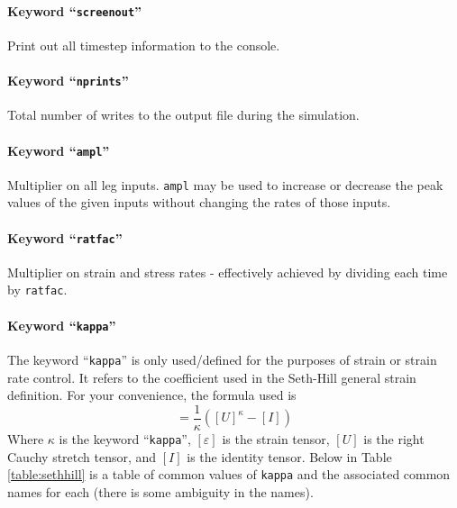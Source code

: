 \documentclass[11pt]{article}
\newcommand{\ratfac}{\texttt{ratfac}}
\newcommand{\shparam}{\texttt{kappa}}
\newcommand{\ampl}{\texttt{ampl}}
\newcommand{\nprints}{\texttt{nprints}}
\newcommand{\screenout}{\texttt{screenout}}
\begin{document}
\paragraph{Keyword ``\screenout{}''}
Print out all timestep information to the console.

\paragraph{Keyword ``\nprints{}''}
Total number of writes to the output file during the simulation.

\paragraph{Keyword ``\ampl{}''}
Multiplier on all leg inputs.  \ampl{} may be used to increase or decrease the peak
values of the given inputs without changing the rates of those inputs.

\paragraph{Keyword ``\ratfac{}''}
Multiplier on strain and stress rates - effectively achieved by dividing each
time by \ratfac{}.

\paragraph{Keyword ``\shparam{}''}
The keyword ``\shparam{}'' is only used/defined for the purposes of strain or strain
rate control. It refers to the coefficient used in the Seth-Hill general strain
definition. For your convenience, the formula used is
%
\begin{equation}
  [\varepsilon] = \frac{1}{\kappa}\left( [U]^\kappa - [I]\right)
\end{equation}
%
Where $\kappa$ is the keyword ``\shparam{}'', $[\varepsilon]$ is the strain tensor,
$[U]$ is the right Cauchy stretch tensor, and $[I]$ is the identity tensor. Below
in Table \ref{table:sethhill} is a table of common values of \shparam{} and the
associated common names for each (there is some ambiguity in the names).
\end{document}
